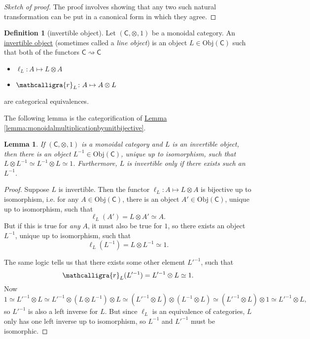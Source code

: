 \documentclass[a4paper,10pt]{scrreprt}
\newcommand{\sr}{\ensuremath{\mathcalligra{r}}}
\newcommand{\defn}[1]{\ul{#1}}
\newcommand{\Obj}{\mathrm{Obj}}
\theoremstyle{definition}
\newtheorem{definition}{Definition}[section]
\theoremstyle{plain}
\newtheorem{lemma}{Lemma}[section]
\theoremstyle{remark}
\begin{document}
\begin{proof}[Sketch of proof]
  The proof involves showing that any two such natural transformation can be put in a canonical form in which they agree.
\end{proof}

\begin{definition}[invertible object]
  \label{def:invertibleobject}
  Let $(\mathsf{C}, \otimes, 1)$ be a monoidal category. An \defn{invertible object} (sometimes called a \emph{line object}) is an object $L \in \Obj(\mathsf{C})$ such that both of the functors $\mathsf{C} \rightsquigarrow \mathsf{C}$
  \begin{itemize}
    \item $\ell_{L}\colon A \mapsto L \otimes A$ 
    \item $\sr_{L}\colon A \mapsto A \otimes L$
  \end{itemize}
  are categorical equivalences.
\end{definition}

The following lemma is the categorification of \hyperref[lemma:monoidalmultiplicationbyunitbijective]{Lemma \ref*{lemma:monoidalmultiplicationbyunitbijective}}.
\begin{lemma}
  If $(\mathsf{C}, \otimes, 1)$ is a monoidal category and $L$ is an invertible object, then there is an object $L^{-1} \in \Obj(\mathsf{C})$, unique up to isomorphism, such that $L \otimes L^{-1} \simeq L^{-1} \otimes L \simeq 1$. Furthermore, $L$ is invertible only if there exists such an $L^{-1}$.
\end{lemma}
\begin{proof}
  Suppose $L$ is invertible. Then the functor $\ell_{L}\colon A \mapsto L \otimes A$ is bijective up to isomorphism, i.e. for any $A \in \Obj(\mathsf{C})$, there is an object $A' \in \Obj(\mathsf{C})$, unique up to isomorphism, such that
  \begin{equation*}
    \ell_{L}(A') = L \otimes A' \simeq A.
  \end{equation*}
  But if this is true for \emph{any} $A$, it must also be true for $1$, so there exists an object $L^{-1}$, unique up to isomorphism, such that
  \begin{equation*}
    \ell_{L}(L^{-1}) = L \otimes L^{-1} \simeq 1.
  \end{equation*}

  The same logic tells us that there exists some other element $L'^{-1}$, such that 
  \begin{equation*}
    \sr_{L}(L'^{-1}) = L'^{-1} \otimes L \simeq 1.
  \end{equation*}
  Now 
  \begin{equation*}
    1 \simeq L'^{-1} \otimes L \simeq L'^{-1} \otimes (L \otimes L^{-1}) \otimes L \simeq (L'^{-1} \otimes L) \otimes (L^{-1} \otimes L) \simeq (L'^{-1} \otimes L) \otimes 1 \simeq L'^{-1} \otimes L,
  \end{equation*}
  so $L'^{-1}$ is also a left inverse for $L$. But since $\ell_{L}$ is an equivalence of categories, $L$ only has one left inverse up to isomorphism, so $L^{-1}$ and $L'^{-1}$ must be isomorphic.
\end{proof}
\end{document}
